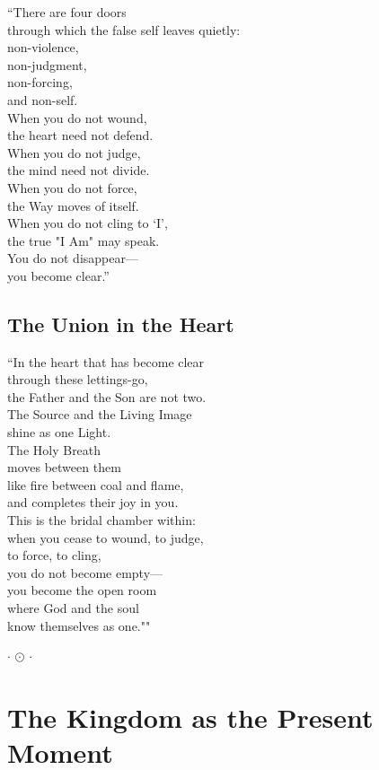 \documentclass[10pt, openright]{book}
\newcommand{\sectionbreak}{\filbreak}
\newcommand{\ornament}{
    \vspace{1.5cm}
    \begin{center}
        \large \(\cdot\) \(\odot\) \(\cdot\)
    \end{center}
    \vspace{1.5cm}
}
\begin{document}
``There are four doors\\
through which the false self leaves quietly:\\
non-violence,\\
non-judgment,\\
non-forcing,\\
and non-self.\\
When you do not wound,\\
the heart need not defend.\\
When you do not judge,\\
the mind need not divide.\\
When you do not force,\\
the Way moves of itself.\\
When you do not cling to `I',\\
the true "I Am" may speak.\\
You do not disappear---\\
you become clear.''

\sectionbreak

\section{The Union in the Heart}\label{the-union-in-the-heart}

``In the heart that has become clear\\
through these lettings-go,\\
the Father and the Son are not two.\\
The Source and the Living Image\\
shine as one Light.\\
The Holy Breath\\
moves between them\\
like fire between coal and flame,\\
and completes their joy in you.\\
This is the bridal chamber within:\\
when you cease to wound, to judge,\\
to force, to cling,\\
you do not become empty---\\
you become the open room\\
where God and the soul\\
know themselves as one.""

\ornament

\chapter{The Kingdom as the Present
Moment}\label{the-kingdom-as-the-present-moment}
\end{document}
